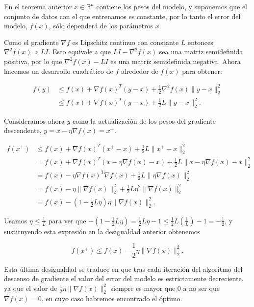 En el teorema anterior $x \in \mathbb{R}^n$ contiene los pesos del modelo, y suponemos que el conjunto de datos con el que entrenamos es constante, por lo tanto el error del modelo, $f(x)$, sólo dependerá de los parámetros $x$.

Como el gradiente $\nabla f$ es Lipschitz continuo con constante $L$ entonces $\nabla ^2 f(x) \preceq LI$. Esto equivale a que $ \textstyle LI- \nabla^2f(x) $ sea una matriz semidefinida positiva, por lo que $\nabla ^2 f(x) -LI$ es una matriz semidefinida negativa. Ahora hacemos un desarrollo cuadrático de $f$ alrededor de $f(x)$ para obtener:

\begin{align*}
    f(y) &\leq f(x) + \nabla f(x)^T (y-x) +\frac{1}{2}\nabla^2 f(x) \|y-x\|^2_2  \\
    &\leq f(x) + \nabla f(x)^T(y-x) + \frac{1}{2}L \|y - x \|^2_2.
\end{align*}

Consideramos ahora $y$ como la actualización de los pesos del gradiente descendente, $y=x - \eta \nabla f(x)=x^+$. 


\begin{align*}
    f(x^+) &\leq f(x) + \nabla f(x)^T(x^+-x) + \frac{1}{2}L \|x^+ - x \|^2_2 \\
    &= f(x) + \nabla f(x)^T(x - \eta \nabla f(x) -x) + \frac{1}{2}L \|x - \eta \nabla f(x) - x \|^2_2 \\
    &= f(x) - \eta \nabla f(x)^T \nabla f(x) + \frac{1}{2} L \| \eta \nabla f(x) \|^2_2 \\
    &= f(x) - \eta \| \nabla f(x) \|^2_2 + \frac{1}{2} L \eta^2 \| \nabla f(x) \|^2_2 \\
    &= f(x) - (1- \frac{1}{2}L \eta) \eta \| \nabla f(x) \|^2_2.
\end{align*}

Usamos $\eta \leq \frac{1}{L}$ para ver que $-(1-\frac{1}{2}L \eta)= \frac{1}{2} L \eta - 1 \leq \frac{1}{2} L (\frac{1}{L}) - 1 = -\frac{1}{2}$, y sustituyendo esta expresión en la desigualdad anterior obtenemos 

\begin{equation}\label{eq:gdproof1}
	f(x^+) \leq f(x) - \frac{1}{2} \eta \| \nabla f(x) \|^2_2 .
\end{equation}

Esta última desigualdad se traduce en que tras cada iteración del algoritmo del descenso de gradiente el valor del error del modelo es estrictamente decreciente, ya que el valor de $\frac{1}{2} \eta \| \nabla f(x) \|^2_2$ siempre es mayor que 0 a no ser que $\nabla f(x)=0$, en cuyo caso habremos encontrado el óptimo. 

